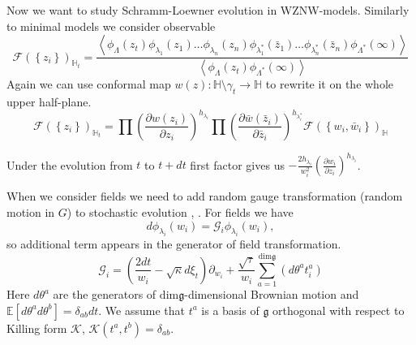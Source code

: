 \documentclass[a4paper]{jpconf}
\theoremstyle{definition}
\newcommand{\gf}{\mathfrak{g}}
\theoremstyle{definition} \newtheorem{Def}{Definition}
\begin{document}
Now we want to study Schramm-Loewner evolution in WZNW-models.
Similarly to minimal models we consider observable
\begin{equation*}
  \mathcal{F}(\left\{z_{i}\right\})_{\mathbb{H}_{t}}=
  \frac{\left<\phi_{\Lambda}(z_{t}) \phi_{\lambda_1}(z_{1}) \dots \phi_{\lambda_n}(z_{n}) \phi_{\lambda^{*}_1}(\bar z_{1}) \dots \phi_{\lambda^{*}_n}(\bar z_{n})
      \phi_{\Lambda^{*}}(\infty)\right>}{\left<\phi_{\Lambda}(z_{t})\phi_{\Lambda^{*}}(\infty)\right>}
\end{equation*}
Again we can use conformal map  $w(z):\mathbb{H}\setminus\gamma_{t}\to \mathbb{H}$ to rewrite it on the whole upper half-plane. 
\begin{equation*}
  \mathcal{F}(\left\{z_{i}\right\})_{\mathbb{H}_{t}}=\prod \left(\frac{\partial w(z_{i})}{\partial z_{i}}\right)^{h_{\lambda_i}} 
  \prod \left(\frac{\partial \bar w(\bar z_{i})}{\partial \bar z_{i}}\right)^{h_{\lambda^{*}_i}}
  \mathcal{F}(\left\{w_{i}, \bar w_{i}\right\})_{\mathbb{H}}
\end{equation*}

Under the evolution from $t$ to $t+dt$ first factor gives us $-\frac{2h_{\lambda_{i}}}{w_{i}^{2}}\left(\frac{\partial w_{i}}{\partial z_{i}}\right)^{h_{\lambda_{i}}}$.

When we consider fields we need to add random gauge transformation (random motion in $G$) to stochastic evolution \cite{bettelheim2005stochastic}, \cite{alekseev2010sle}. 
For fields we have
\begin{equation*}
  d\phi_{\lambda_{i}}(w_{i}) = \mathcal{G}_{i}\phi_{\lambda_{i}}(w_{i}),
\end{equation*}
so additional term appears in the generator of field transformation. 
\begin{equation*}
  \mathcal{G}_{i}=\left(\frac{2dt}{w_{i}}-\sqrt{\kappa} d\xi_{t}\right) \partial_{w_{i}}+\frac{\sqrt{\tau}}{w_{i}}\sum_{a=1}^{\mathrm{dim} \gf}\left(d \theta ^{a} t^{a}_{i}\right)
\end{equation*}
Here $d\theta^{a}$ are the generators of $\mathrm{dim}\gf$-dimensional Brownian motion and $\mathbb{E}[d\theta^{a}d\theta^{b}]=\delta_{ab}dt$. We assume that $t^{a}$ is a basis of $\gf$ orthogonal with respect to Killing form $\mathcal{K}$, $\mathcal{K}(t^{a},t^{b})=\delta_{ab}$.
\end{document}
